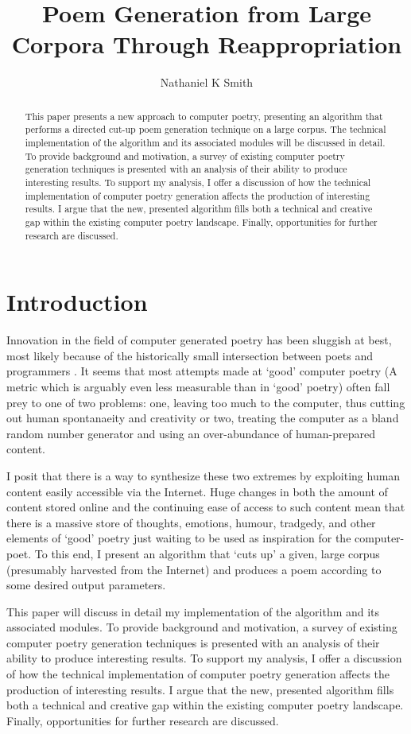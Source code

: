 \documentclass[10pt]{article}
\title{Poem Generation from Large Corpora Through Reappropriation}
\author{Nathaniel K Smith}
\begin{document}
\maketitle

\begin{abstract}
This paper presents a new approach to computer poetry, presenting an algorithm
that performs a directed cut-up poem generation technique on a large corpus. The
technical implementation of the algorithm and its associated modules will be
discussed in detail. To provide background and motivation, a survey of existing
computer poetry generation techniques is presented with an analysis of their
ability to produce interesting results. To support my analysis, I offer a
discussion of how the technical implementation of computer poetry generation
affects the production of interesting results. I argue that the new, presented
algorithm fills both a technical and creative gap within the existing computer
poetry landscape. Finally, opportunities for further research are discussed.
\end{abstract}

\section{Introduction}
Innovation in the field of computer generated poetry has been sluggish at best,
most likely because of the historically small intersection between poets and
programmers \cite{Hart96}. It seems that most attempts made at `good' computer
poetry (A metric which is arguably even less measurable than in `good' poetry)
often fall prey to one of two problems: one, leaving too much to the computer,
thus cutting out human spontanaeity and creativity or two, treating the
computer as a bland random number generator and using an over-abundance of
human-prepared content.

I posit that there is a way to synthesize these two extremes by exploiting
human content easily accessible via the Internet. Huge changes in both the
amount of content stored online and the continuing ease of access to such
content mean that there is a massive store of thoughts, emotions, humour,
tradgedy, and other elements of `good' poetry just waiting to be used as
inspiration for the computer-poet. To this end, I present an algorithm that
`cuts up' a given, large corpus (presumably harvested from the Internet) and
produces a poem according to some desired output parameters.

This paper will discuss in detail my implementation of the algorithm and its
associated modules. To provide background and motivation, a survey of existing
computer poetry generation techniques is presented with an analysis of their
ability to produce interesting results. To support my analysis, I offer a
discussion of how the technical implementation of computer poetry generation
affects the production of interesting results. I argue that the new, presented
algorithm fills both a technical and creative gap within the existing computer
poetry landscape. Finally, opportunities for further research are discussed.
\end{document}
